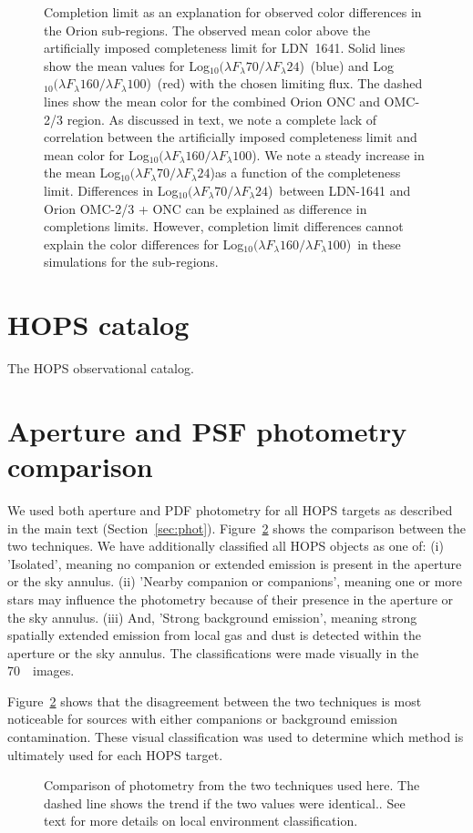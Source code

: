 \documentclass[manuscript]{aastex61}
\newcommand{\clra}{Log$_{10}(\lambda F_\lambda70/\lambda F_\lambda24$)}
\newcommand{\clrb}{Log$_{10}(\lambda F_\lambda160/\lambda F_\lambda100$)}
\begin{document}
\begin{figure}[ht]
\centering
{}
\caption{Completion limit as an explanation for observed color differences in the Orion sub-regions.  The observed mean color above the artificially imposed completeness limit for LDN~1641.  Solid lines show the mean values for \clra\ (blue) and \clrb\ (red) with the chosen limiting flux.  The dashed lines show the mean color for the combined Orion ONC and OMC-2/3 region.  As discussed in text, we note a complete lack of correlation between the artificially imposed completeness limit and mean color for \clrb.  We note a steady increase in the mean \clra as a function of the completeness limit.  Differences in \clra\ between LDN-1641 and Orion OMC-2/3 + ONC can be explained as difference in completions limits.  However, completion limit differences cannot explain the color differences for \clrb\ in these simulations for the sub-regions.\label{fig:clr_v_limit}}
\end{figure}

\appendix

\section{HOPS catalog}
\par
The HOPS observational catalog.


\section{Aperture and PSF photometry comparison}
\par
We used both aperture and PDF photometry for all HOPS targets as described in the main text (Section~\ref{sec:phot}).  Figure~\ref{fig:aper_psf_comp} shows the comparison between the two techniques.  We have additionally classified all HOPS objects as one of: (i) 'Isolated', meaning no companion or extended emission is present in the aperture or the sky annulus.  (ii) 'Nearby companion or companions', meaning one or more stars may influence the photometry because of their presence in the aperture or the sky annulus.  (iii) And, 'Strong background emission', meaning strong spatially extended emission from local gas and dust is detected within the aperture or the sky annulus.  The classifications were made visually in the 70~\micron\ images.
\par
Figure~\ref{fig:aper_psf_comp} shows that the disagreement between the two techniques is most noticeable for sources with either companions or background emission contamination.  These visual classification was used to determine which method is ultimately used for each HOPS target.
\begin{figure}[ht]
\centering
{}
\caption{Comparison of photometry from the two techniques used here. The dashed line shows the trend if the two values were identical.\label{fig:aper_psf_comp}.  See text for more details on local environment classification.}
\end{figure}
\end{document}
